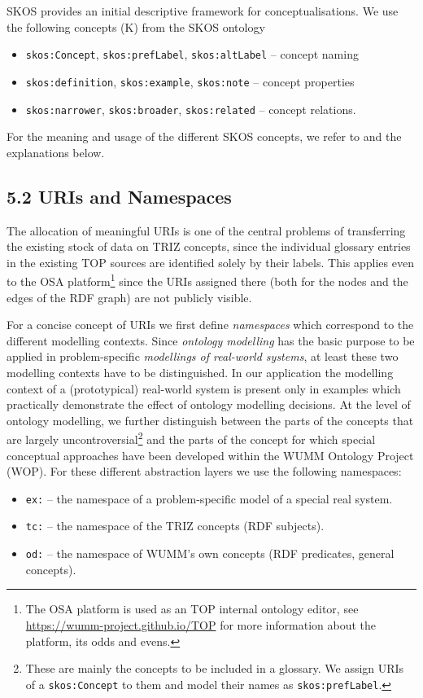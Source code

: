 \documentclass[12pt,a4paper]{article}
\begin{document}
SKOS provides an initial descriptive framework for conceptualisations. We use
the following concepts (K) from the SKOS ontology \cite{19}
\begin{itemize}
\item \texttt{skos:Concept}, \texttt{skos:prefLabel}, \texttt{skos:altLabel} –
  concept naming
\item \texttt{skos:definition}, \texttt{skos:example}, \texttt{skos:note} –
  concept properties
\item \texttt{skos:narrower}, \texttt{skos:broader}, \texttt{skos:related} –
  concept relations.
\end{itemize}
For the meaning and usage of the different SKOS concepts, we refer to
\cite{19} and the explanations below.

\subsection*{5.2 URIs and Namespaces}

The allocation of meaningful URIs is one of the central problems of
transferring the existing stock of data on TRIZ concepts, since the individual
glossary entries in the existing TOP sources are identified solely by their
labels. This applies even to the OSA platform\footnote{The OSA platform is
  used as an TOP internal ontology editor, see
  \url{https://wumm-project.github.io/TOP} for more information about the
  platform, its odds and evens.} since the URIs assigned there (both for the
nodes and the edges of the RDF graph) are not publicly visible.

For a concise concept of URIs we first define \emph{namespaces} which
correspond to the different modelling contexts. Since \emph{ontology
  modelling} has the basic purpose to be applied in problem-specific
\emph{modellings of real-world systems}, at least these two modelling contexts
have to be distinguished. In our application the modelling context of a
(prototypical) real-world system is present only in examples which practically
demonstrate the effect of ontology modelling decisions. At the level of
ontology modelling, we further distinguish between the parts of the concepts
that are largely uncontroversial\footnote{These are mainly the concepts to be
  included in a glossary. We assign URIs of a \texttt{skos:Concept} to them
  and model their names as \texttt{skos:prefLabel}.} and the parts of the
concept for which special conceptual approaches have been developed within the
WUMM Ontology Project (WOP). For these different abstraction layers we use the
following namespaces:
\begin{itemize}
\item \texttt{ex:} – the namespace of a problem-specific model of a special
  real system.
\item \texttt{tc:} – the namespace of the TRIZ concepts (RDF subjects).
\item \texttt{od:} – the namespace of WUMM’s own concepts (RDF predicates,
  general concepts).
\end{itemize}
\end{document}
